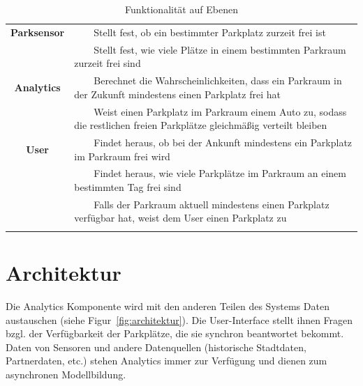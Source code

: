 \documentclass{article}
\newcommand{\tabitem}{~~\llap{\textbullet}~~}
\begin{document}
{\small
\begin{longtable}{| c | >{\raggedright\arraybackslash}p{9cm} |}%
    \hline
     & \multicolumn{1}{c|}{\textbf{Anfragen}} \\ \hline
    \textbf{Parksensor} & \tabitem Stellt fest, ob ein bestimmter Parkplatz zurzeit frei ist \\ 
     		   & \tabitem Stellt fest, wie viele Pl\"atze in einem bestimmten Parkraum zurzeit frei sind \\ \hline 
    \textbf{Analytics} & \tabitem Berechnet die Wahrscheinlichkeiten, dass ein Parkraum in der Zukunft mindestens einen Parkplatz frei hat \\
    			& \tabitem Weist einen Parkplatz im Parkraum einem Auto zu, sodass die restlichen freien Parkpl\"atze gleichm\"a\ss{}ig verteilt bleiben \\ \hline
    \textbf{User} & \tabitem Findet heraus, ob bei der Ankunft mindestens ein Parkplatz im Parkraum frei wird \\ 
    	& \tabitem Findet heraus, wie viele Parkpl\"atze im Parkraum an einem bestimmten Tag frei sind \\
    	& \tabitem Falls der Parkraum aktuell mindestens einen Parkplatz verf\"ugbar hat, weist dem User einen Parkplatz zu \\ \hline
	\caption{Funktionalit\"at auf Ebenen}
 	\label{tabelle}
\end{longtable}}


\section{Architektur}
Die Analytics Komponente wird mit den anderen Teilen des Systems Daten austauschen (siehe Figur~\ref{fig:architektur}). Die User-Interface stellt ihnen Fragen bzgl. der Verf\"ugbarkeit der Parkpl\"atze, die sie synchron beantwortet bekommt. Daten von Sensoren und andere Datenquellen (historische Stadtdaten, Partnerdaten, etc.) stehen Analytics immer zur Verf\"ugung und dienen zum asynchronen Modellbildung.
\end{document}
